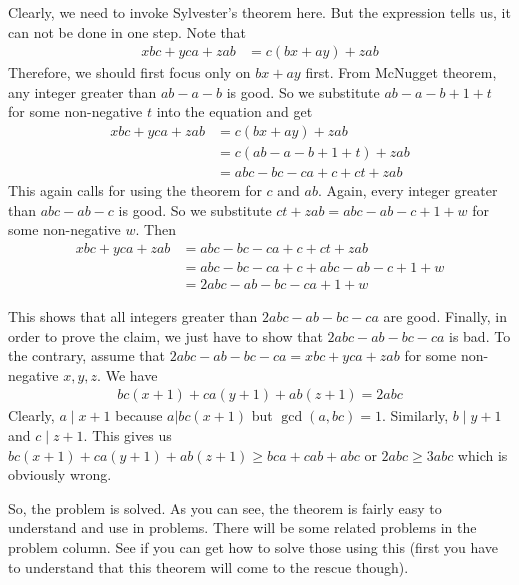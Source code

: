 	\begin{solution}
		Clearly, we need to invoke Sylvester's theorem here. But the expression tells us, it can not be done in one step. Note that
			\begin{align*}
				xbc+yca+zab & = c(bx+ay)+zab
			\end{align*}
		Therefore, we should first focus only on $bx+ay$ first. From McNugget theorem, any integer greater than $ab-a-b$ is good. So we substitute $ab-a-b+1+t$ for some non-negative $t$ into the equation and get
			\begin{align*}
				xbc+yca+zab & = c(bx+ay)+zab\\
							& = c(ab-a-b+1+t)+zab\\
							& = abc-bc-ca+c+ct+zab
			\end{align*}
		This again calls for using the theorem for $c$ and $ab$. Again, every integer greater than $abc-ab-c$ is good. So we substitute $ct+zab=abc-ab-c+1+w$ for some non-negative $w$. Then
			\begin{align*}
				xbc+yca+zab & = abc-bc-ca+c+ct+zab\\
							& = abc-bc-ca+c+abc-ab-c+1+w\\
							& = 2abc-ab-bc-ca+1+w
			\end{align*}
	\end{solution}
This shows that all integers greater than $2abc-ab-bc-ca$ are good.	Finally, in order to prove the claim, we just have to show that $2abc-ab-bc-ca$ is bad. To the contrary, assume that $2abc-ab-bc-ca=xbc+yca+zab$ for some non-negative $x,y,z$. We have
	\begin{align*}
		bc(x+1)+ca(y+1)+ab(z+1)=2abc
	\end{align*}
Clearly, $a\mid x+1$ because $a|bc(x+1)$ but $\gcd(a,bc)=1$. Similarly, $b\mid y+1$ and $c\mid z+1$. This gives us $bc(x+1)+ca(y+1)+ab(z+1)\geq bca+cab+abc$ or $2abc\geq3abc$ which is obviously wrong.

So, the problem is solved. As you can see, the theorem is fairly easy to understand and use in problems. There will be some related problems in the problem column. See if you can get how to solve those using this (first you have to understand that this theorem will come to the rescue though).

